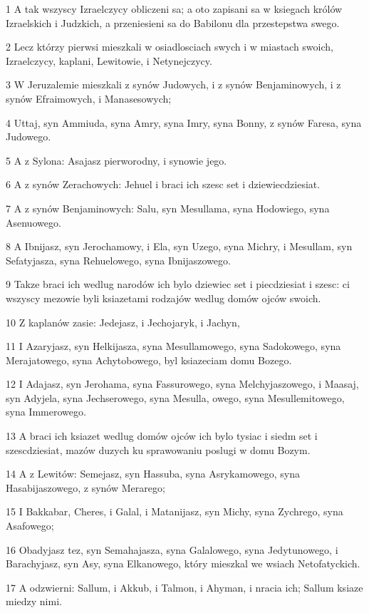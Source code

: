 \par 1 A tak wszyscy Izraelczycy obliczeni sa; a oto zapisani sa w ksiegach królów Izraelskich i Judzkich, a przeniesieni sa do Babilonu dla przestepstwa swego.
\par 2 Lecz którzy pierwsi mieszkali w osiadlosciach swych i w miastach swoich, Izraelczycy, kaplani, Lewitowie, i Netynejczycy.
\par 3 W Jeruzalemie mieszkali z synów Judowych, i z synów Benjaminowych, i z synów Efraimowych, i Manasesowych;
\par 4 Uttaj, syn Ammiuda, syna Amry, syna Imry, syna Bonny, z synów Faresa, syna Judowego.
\par 5 A z Sylona: Asajasz pierworodny, i synowie jego.
\par 6 A z synów Zerachowych: Jehuel i braci ich szesc set i dziewiecdziesiat.
\par 7 A z synów Benjaminowych: Salu, syn Mesullama, syna Hodowiego, syna Asenuowego.
\par 8 A Ibnijasz, syn Jerochamowy, i Ela, syn Uzego, syna Michry, i Mesullam, syn Sefatyjasza, syna Rehuelowego, syna Ibnijaszowego.
\par 9 Takze braci ich wedlug narodów ich bylo dziewiec set i piecdziesiat i szesc: ci wszyscy mezowie byli ksiazetami rodzajów wedlug domów ojców swoich.
\par 10 Z kaplanów zasie: Jedejasz, i Jechojaryk, i Jachyn,
\par 11 I Azaryjasz, syn Helkijasza, syna Mesullamowego, syna Sadokowego, syna Merajatowego, syna Achytobowego, byl ksiazeciam domu Bozego.
\par 12 I Adajasz, syn Jerohama, syna Fassurowego, syna Melchyjaszowego, i Maasaj, syn Adyjela, syna Jechserowego, syna Mesulla, owego, syna Mesullemitowego, syna Immerowego.
\par 13 A braci ich ksiazet wedlug domów ojców ich bylo tysiac i siedm set i szescdziesiat, mazów duzych ku sprawowaniu poslugi w domu Bozym.
\par 14 A z Lewitów: Semejasz, syn Hassuba, syna Asrykamowego, syna Hasabijaszowego, z synów Merarego;
\par 15 I Bakkabar, Cheres, i Galal, i Matanijasz, syn Michy, syna Zychrego, syna Asafowego;
\par 16 Obadyjasz tez, syn Semahajasza, syna Galalowego, syna Jedytunowego, i Barachyjasz, syn Asy, syna Elkanowego, który mieszkal we wsiach Netofatyckich.
\par 17 A odzwierni: Sallum, i Akkub, i Talmon, i Ahyman, i nracia ich; Sallum ksiaze miedzy nimi.
